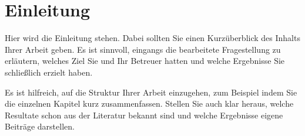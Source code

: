 \section*{Einleitung}

Hier wird die Einleitung stehen. Dabei sollten Sie einen Kurzüberblick des Inhalts Ihrer Arbeit geben. Es ist sinnvoll, eingangs die bearbeitete Fragestellung zu erläutern, welches Ziel Sie und Ihr Betreuer hatten und welche Ergebnisse Sie schließlich erzielt haben.

Es ist hilfreich, auf die Struktur Ihrer Arbeit einzugehen, zum Beispiel indem Sie die einzelnen Kapitel kurz zusammenfassen. Stellen Sie auch klar heraus, welche Resultate schon aus der Literatur bekannt sind und welche Ergebnisse eigene Beiträge darstellen.

